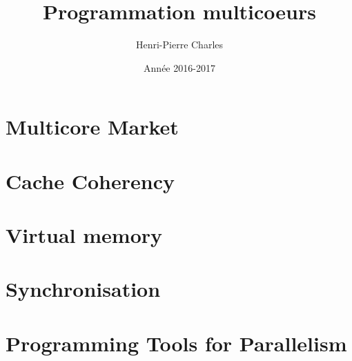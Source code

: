 \documentclass{beamer}
\title{Programmation multicoeurs}
\subtitle{}
\author{Henri-Pierre Charles}
\date{Année 2016-2017}
\newcommand{\Slide}[1]{}
\begin{document}
\begin{frame}
\titlepage
\end{frame}


\section{Multicore Market}
\Slide{Market/MotivatingExample1}
\Slide{Market/MotivatingExample2}
\Slide{Market/MotivatingExample3}
\Slide{Market/MotivatingCode1}
\Slide{Market/MotivatingCode2}

\section{Cache Coherency}
\Slide{Caches/Intro}

\section{Virtual memory}
\Slide{VirtualMemory/Intro}

\section{Synchronisation}
\Slide{VirtualMemory/Synchro}

\section{Programming Tools for Parallelism}
\Slide{ProgrammingTools/Intro}
\end{document}
